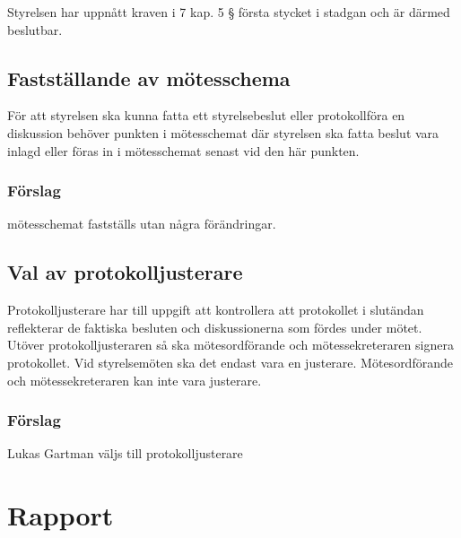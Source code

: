 \documentclass[protokoll]{dvd}
\begin{document}
\begin{attsatser}
    \item Styrelsen har uppnått kraven i 7 kap. 5 § första stycket i stadgan och är därmed beslutbar.
\end{attsatser}

\subsection{Fastställande av mötesschema}

För att styrelsen ska kunna fatta ett styrelsebeslut eller protokollföra en diskussion behöver punkten i mötesschemat där styrelsen ska fatta beslut vara inlagd eller föras in i mötesschemat senast vid den här punkten.

\subsubsection*{Förslag}

\begin{attsatser}
    \item mötesschemat fastställs utan några förändringar.
\end{attsatser}

\subsection{Val av protokolljusterare}

Protokolljusterare har till uppgift att kontrollera att protokollet i slutändan reflekterar de faktiska besluten och diskussionerna som fördes under mötet.
Utöver protokolljusteraren så ska mötesordförande och mötessekreteraren signera protokollet.
Vid styrelsemöten ska det endast vara en justerare.
Mötesordförande och mötessekreteraren kan inte vara justerare.

\subsubsection*{Förslag}
\begin{attsatser}
    \item Lukas Gartman väljs till protokolljusterare
\end{attsatser}

\section{Rapport}

\end{document}
